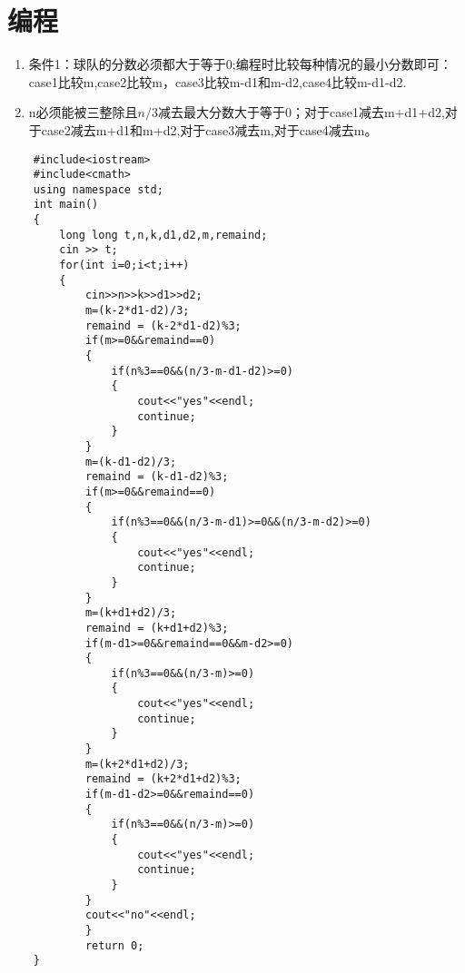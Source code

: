 \documentclass[a4paper]{article}
\begin{document}
	\section{编程}
	
	\begin{enumerate}
		\item 条件1：球队的分数必须都大于等于0;编程时比较每种情况的最小分数即可：case1比较m,case2比较m，case3比较m-d1和m-d2,case4比较m-d1-d2.
		\item n必须能被三整除且$n/3$减去最大分数大于等于0；对于case1减去m+d1+d2,对于case2减去m+d1和m+d2,对于case3减去m,对于case4减去m。
	\end{enumerate}

	\begin{lstlisting}
	#include<iostream>
	#include<cmath>
	using namespace std;
	int main()
	{
		long long t,n,k,d1,d2,m,remaind;	
		cin >> t;
		for(int i=0;i<t;i++)
		{
			cin>>n>>k>>d1>>d2;
			m=(k-2*d1-d2)/3;
			remaind = (k-2*d1-d2)%3;
			if(m>=0&&remaind==0)
			{
				if(n%3==0&&(n/3-m-d1-d2)>=0)
				{
					cout<<"yes"<<endl;
					continue;
				}
			}
			m=(k-d1-d2)/3;
			remaind = (k-d1-d2)%3;
			if(m>=0&&remaind==0)
			{
				if(n%3==0&&(n/3-m-d1)>=0&&(n/3-m-d2)>=0)
				{
					cout<<"yes"<<endl;
					continue;
				}
			}
			m=(k+d1+d2)/3;
			remaind = (k+d1+d2)%3;
			if(m-d1>=0&&remaind==0&&m-d2>=0)
			{
				if(n%3==0&&(n/3-m)>=0)
				{
					cout<<"yes"<<endl;
					continue;
				}
			}
			m=(k+2*d1+d2)/3;
			remaind = (k+2*d1+d2)%3;
			if(m-d1-d2>=0&&remaind==0)
			{
				if(n%3==0&&(n/3-m)>=0)
				{
					cout<<"yes"<<endl;
					continue;
				}
			}
			cout<<"no"<<endl;
			}
			return 0;
	}
	\end{lstlisting}
	
\end{document}
